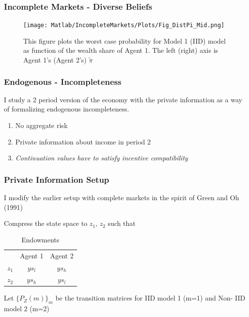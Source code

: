 \documentclass{beamer}
\begin{document}
\begin{frame}
\frametitle{Incomplete Markets - Diverse Beliefs}
\begin{figure}[htbp]
\centering
	  \texttt{[image: Matlab/IncompleteMarkets/Plots/Fig\_DistPi\_Mid.png]}

	\caption{This figure plots the worst case probability for
          Model 1 (IID) model as function of the wealth share of Agent
        1. The left (right) axis is Agent 1's (Agent 2's) $\tilde{\pi}$ }
	\label{fig:RelShare_0}
\end{figure} 

\end{frame}

\begin{frame}
\frametitle{Endogenous - Incompleteness}
I study a 2 period version of the  economy with the private
information as a way of formalizing endogenous incompleteness.
\begin{enumerate}
\item No aggregate risk
\item Private information about income in period 2
\item \emph{Continuation values have to satisfy incentive compatibility}

\end{enumerate}
\end{frame}


\begin{frame}
\frametitle{Private Information Setup }
I modify the earlier setup with complete markets in the spirit of  Green and Oh (1991)

Compress the state space to $z_1$, $z_2$ such that

\begin{table}[h]
  \centering
  \begin{tabular}[h]{l c c}
    
& Agent 1 & Agent 2 \\
$z_1$ & $ys_l$ & $y s_h$  \\
$z_2$ & $ys_h$ & $ys_l$ \\
 
  \end{tabular}
  \caption{Endowments}
  
\end{table}

Let $\{P_Z(m)\}_m  $ be the transition matrices for IID model 1 (m=1) and
Non- IID model 2 (m=2)


\end{frame}
\end{document}
